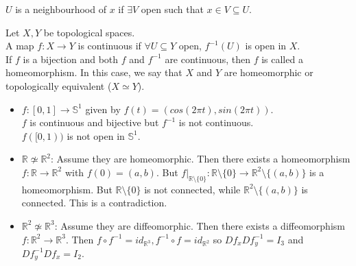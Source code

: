 \begin{definition}\label{1.5}
    $U$ is a neighbourhood of $x$ if $\exists V$ open such that $x \in V \subseteq U$.
\end{definition}
\begin{definition}\label{1.6}
    Let $X,Y$ be topological spaces. \\
    A map $f:X\to Y$ is continuous if $\forall U\subseteq Y$ open, $f^{-1}(U)$ is open in $X$.\\
    If $f$ is a bijection and both $f$ and $f^{-1}$ are continuous, then $f$ is called a homeomorphism. In this case, we say that $X$ and $Y$ are homeomorphic or topologically equivalent ($X\simeq Y$).
\end{definition}
\begin{example}\label{1.7}
    \leavevmode
    \begin{itemize}
        \item  $f:[0,1]\to \mathbb{S}^1$ given by $f(t) = (cos(2\pi t), sin(2\pi t))$. \\
        $f$ is continuous and bijective but $f^{-1}$ is not continuous.\\
        $f([0,1))$ is not open in $\mathbb{S}^1$.
        \item $\mathbb{R}\not\simeq \mathbb{R}^2$: Assume they are homeomorphic. Then there exists a homeomorphism $f:\mathbb{R}\to \mathbb{R}^2$ with $f(0)=(a,b)$. But $f|_{\mathbb{R}\setminus\{0\}}:\mathbb{R}\setminus\{0\}\to \mathbb{R}^2\setminus\{(a,b)\}$ is a homeomorphism. But $\mathbb{R}\setminus\{0\}$ is not connected, while $\mathbb{R}^2\setminus\{(a,b)\}$ is connected. This is a contradiction. 
        \item $\mathbb{R}^2\not\simeq \mathbb{R}^3$: Assume they are diffeomorphic. Then there exists a diffeomorphism $f:\mathbb{R}^2\to \mathbb{R}^3$. Then $f\circ f^{-1}=id_{\mathbb{R}^3}, f^{-1}\circ f=id_{\mathbb{R}^2}$ so $Df_xDf^{-1}_y=I_3$ and $Df^{-1}_yDf_x=I_2$. 
    \end{itemize}
\end{example}